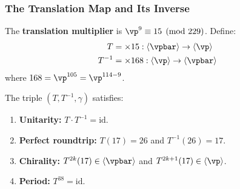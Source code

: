 \subsubsection*{The Translation Map and Its Inverse}

\begin{definition}\label{def:translation}
The \textbf{translation multiplier} is $\vp^9 \equiv 15 \pmod{229}$. Define:
\begin{align}
T &= \times 15 : \langle\vpbar\rangle \to \langle\vp\rangle \\
T^{-1} &= \times 168 : \langle\vp\rangle \to \langle\vpbar\rangle
\end{align}
where $168 = \vp^{105} = \vp^{114 - 9}$.
\end{definition}

\begin{theorem}\label{thm:spectral-triple}
The triple $(T, T^{-1}, \gamma)$ satisfies:
\begin{enumerate}
\item \textbf{Unitarity:} $T \cdot T^{-1} = \mathrm{id}$.
\item \textbf{Perfect roundtrip:} $T(17) = 26$ and $T^{-1}(26) = 17$.
\item \textbf{Chirality:} $T^{2k}(17) \in \langle\vpbar\rangle$ and $T^{2k+1}(17) \in \langle\vp\rangle$.
\item \textbf{Period:} $T^{38} = \mathrm{id}$.
\end{enumerate}
\end{theorem}

